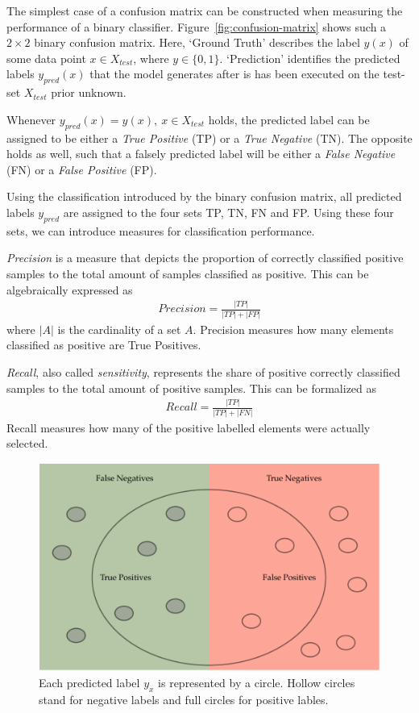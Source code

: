  The simplest case of a confusion matrix can be constructed when measuring the performance of a binary classifier.
Figure~\ref{fig:confusion-matrix} shows such a \( 2 \times 2 \) binary confusion matrix.
Here, `Ground Truth' describes the label \(y(x)\) of some data point \(x \in X_{test}\), where \(y \in \{0, 1\}\).
`Prediction' identifies the predicted labels \(y_{pred}(x)\) that the model generates after is has been executed on the test-set \(X_{test}\) prior unknown.

Whenever \(y_{pred}(x) = y(x),~x \in X_{test}\) holds, the predicted label can be assigned to be either a \emph{True Positive} (TP) or a \emph{True Negative} (TN).
The opposite holds as well, such that a falsely predicted label will be either a \emph{False Negative} (FN) or a \emph{False Positive} (FP).~\cite[p.~2]{THA18}

Using the classification introduced by the binary confusion matrix, all predicted labels \(y_{pred}\) are assigned to the four sets TP, TN, FN and FP.
Using these four sets, we can introduce measures for classification performance.

\emph{Precision} is a measure that depicts the proportion of correctly classified positive samples to the total amount of samples classified as positive.\cite[p.~4]{THA18} This can be algebraically expressed as
\begin{align}\label{eq:precision}
    Precision = \frac{|TP|}{|TP| + |FP|}
\end{align}
where \(|A|\) is the cardinality of a set \(A\). Precision measures how many elements classified as positive are True Positives.

\emph{Recall}, also called \emph{sensitivity}, represents the
share of positive correctly classified samples to the total amount of positive samples.\cite[p.~3]{THA18} This can be formalized as
\begin{align}\label{eq:recall}
    Recall = \frac{|TP|}{|TP| + |FN|}
\end{align}
Recall measures how many of the positive labelled elements were actually selected.

\begin{figure}[ht]
    \centering
    \includegraphics[width=\textwidth]{images/precision-and-recall}
    \caption{Each predicted label \(y_{x}\) is represented by a circle. Hollow circles stand for negative labels and full circles for positive lables.  }
    \label{fig:precision-and-recall}
\end{figure}

